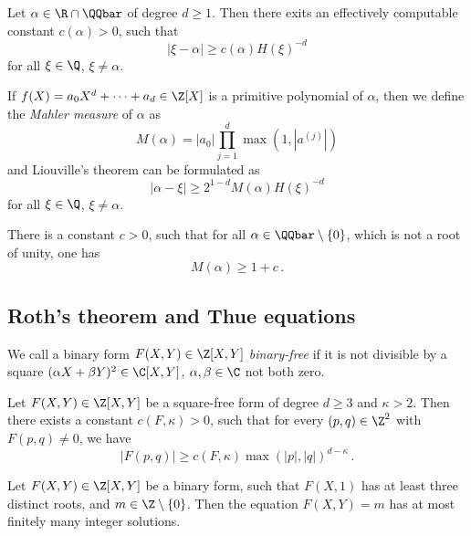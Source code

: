 \begin{thm}[Liouville, 1844]
	Let \( \alpha \in \R \cap \QQbar \) of degree \( d \geq 1 \).
	Then there exits an effectively computable constant \( c(\alpha) > 0 \), such that
	\[ |\xi - \alpha| \geq c(\alpha) H(\xi)^{-d} \]
	for all \( \xi \in \Q \), \( \xi \neq \alpha \).
\end{thm}

\begin{rem*}
	If \( f(X) = a_0 X^d + \dots + a_d \in \Z[X] \) is a primitive polynomial of \( \alpha \), then we define the \emph{Mahler measure} of \( \alpha \) as
	\[ M(\alpha) = |a_0| \prod_{j=1}^d \max (1, |a^{(j)}|) \]
	and Liouville's theorem can be formulated as
	\[ |\alpha - \xi| \geq 2^{1-d} M(\alpha) H(\xi)^{-d} \]
	for all \( \xi \in \Q \), \( \xi \neq \alpha \).
\end{rem*}

\begin{conj*}[Lehmer, 1930s]
	There is a constant \( c>0 \), such that for all \( \alpha \in \QQbar \setminus \{0\} \), which is not a root of unity, one has
	\[ M(\alpha) \geq 1 + c \,. \]
\end{conj*}


\subsection*{Roth's theorem and Thue equations}

\begin{defn*}
	We call a binary form \( F(X,Y) \in \Z[X,Y] \) \emph{binary-free} if it is not divisible by a square \( (\alpha X + \beta Y)^2 \in \C[X,Y] \), \( \alpha, \beta \in \C \) not both zero.
\end{defn*}

\begin{thm}
	Let \( F(X,Y) \in \Z[X,Y] \) be a square-free form of degree \( d \geq 3 \) and \( \kappa > 2 \).
	Then there exists a constant \( c(F,\kappa) > 0 \), such that for every \( (p,q) \in \Z^2 \) with \( F(p,q) \neq 0 \), we have
	\[ |F(p,q)| \geq c(F, \kappa) \max(|p|, |q|)^{d-\kappa} \,. \]
\end{thm}

\begin{cor}
	Let \( F(X,Y) \in \Z[X,Y] \) be a binary form, such that \( F(X,1) \) has at least three distinct roots, and \( m \in \Z \setminus \{0\} \).
	Then the equation \( F(X,Y) = m \) has at most finitely many integer solutions.
\end{cor}



